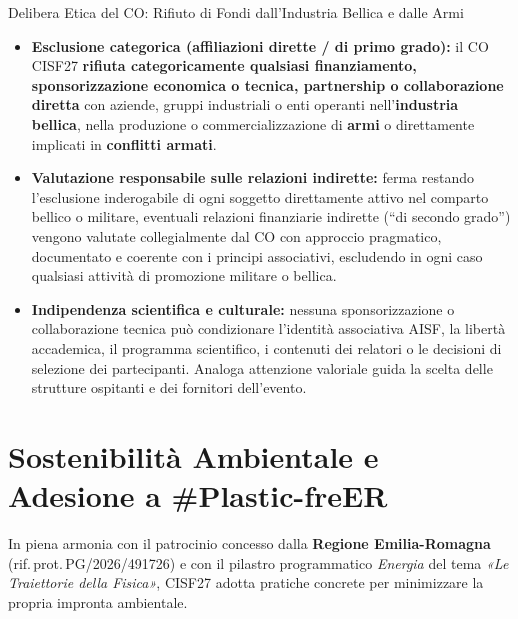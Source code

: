 \documentclass[10pt,a4paper]{article}
\begin{document}
\begin{cisfalert}{\hspace{0.5em}Delibera Etica del CO: Rifiuto di Fondi dall'Industria Bellica e dalle Armi}
\begin{itemize}[topsep=2pt,itemsep=0.25em]
  \item \textbf{Esclusione categorica (affiliazioni dirette / di primo grado):} il CO CISF27 \textbf{rifiuta categoricamente qualsiasi finanziamento, sponsorizzazione economica o tecnica, partnership o collaborazione diretta} con aziende, gruppi industriali o enti operanti nell'\textbf{industria bellica}, nella produzione o commercializzazione di \textbf{armi} o direttamente implicati in \textbf{conflitti armati}.
  \item \textbf{Valutazione responsabile sulle relazioni indirette:} ferma restando l'esclusione inderogabile di ogni soggetto direttamente attivo nel comparto bellico o militare, eventuali relazioni finanziarie indirette (``di secondo grado'') vengono valutate collegialmente dal CO con approccio pragmatico, documentato e coerente con i principi associativi, escludendo in ogni caso qualsiasi attività di promozione militare o bellica.
  \item \textbf{Indipendenza scientifica e culturale:} nessuna sponsorizzazione o collaborazione tecnica può condizionare l'identità associativa AISF, la libertà accademica, il programma scientifico, i contenuti dei relatori o le decisioni di selezione dei partecipanti. Analoga attenzione valoriale guida la scelta delle strutture ospitanti e dei fornitori dell'evento.
\end{itemize}
\end{cisfalert}

\section{Sostenibilità Ambientale e Adesione a \#Plastic-freER}

In piena armonia con il patrocinio concesso dalla \textbf{Regione Emilia-Romagna} (rif.\,prot.\,PG/2026/491726) e con il pilastro programmatico \textit{Energia} del tema \emph{«Le Traiettorie della Fisica»}, CISF27 adotta pratiche concrete per minimizzare la propria impronta ambientale.
\end{document}
